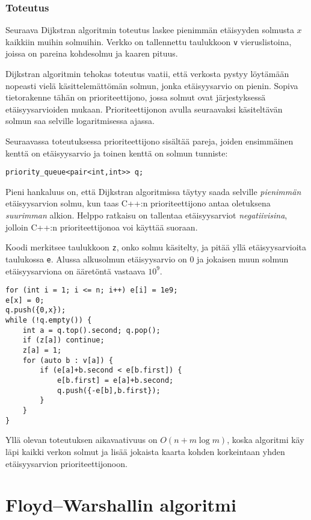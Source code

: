 \subsubsection{Toteutus}

Seuraava Dijkstran algoritmin toteutus laskee
pienimmän etäisyyden solmusta $x$ kaikkiin muihin solmuihin.
Verkko on tallennettu taulukkoon \texttt{v}
vieruslistoina, joissa on pareina kohdesolmu
ja kaaren pituus.

Dijkstran algoritmin tehokas toteutus vaatii,
että verkosta pystyy löytämään
nopeasti vielä käsittelemättömän solmun,
jonka etäisyysarvio on pienin.
Sopiva tietorakenne tähän on prioriteettijono,
jossa solmut ovat järjestyksessä etäisyys\-arvioiden mukaan.
Prioriteettijonon avulla
seuraavaksi käsiteltävän solmun saa selville logaritmisessa ajassa.

Seuraavassa toteutuksessa prioriteettijono sisältää
pareja, joiden ensimmäinen kenttä on etäisyysarvio
ja toinen kenttä on solmun tunniste:
\begin{lstlisting}
priority_queue<pair<int,int>> q;
\end{lstlisting}
Pieni hankaluus on,
että Dijkstran algoritmissa täytyy saada selville
\emph{pienimmän} etäisyysarvion solmu,
kun taas C++:n prioriteettijono antaa oletuksena
\emph{suurimman} alkion.
Helppo ratkaisu on tallentaa etäisyysarviot
\emph{negatiivisina}, jolloin C++:n prioriteettijonoa
voi käyttää suoraan.

Koodi merkitsee taulukkoon \texttt{z},
onko solmu käsitelty,
ja pitää yllä etäisyysarvioita taulukossa \texttt{e}.
Alussa alkusolmun etäisyysarvio on 0
ja jokaisen muun solmun etäisyysarviona
on ääretöntä vastaava $10^9$.

\begin{lstlisting}
for (int i = 1; i <= n; i++) e[i] = 1e9;
e[x] = 0;
q.push({0,x});
while (!q.empty()) {
    int a = q.top().second; q.pop();
    if (z[a]) continue;
    z[a] = 1;
    for (auto b : v[a]) {
        if (e[a]+b.second < e[b.first]) {
            e[b.first] = e[a]+b.second;
            q.push({-e[b],b.first});
        }
    }
}
\end{lstlisting}

Yllä olevan toteutuksen aikavaativuus on $O(n+m \log m)$,
koska algoritmi käy läpi kaikki verkon solmut
ja lisää jokaista kaarta kohden korkeintaan
yhden etäisyysarvion prioriteettijonoon.

\section{Floyd–Warshallin algoritmi}

